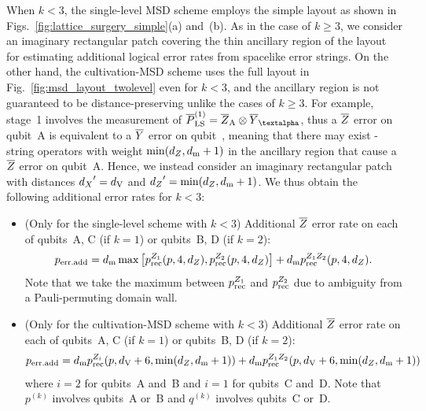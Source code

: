 \documentclass[
 prx,
 reprint,
 superscriptaddress,
 longbibliography,
 dvipsnames
]{revtex4-2}
\begin{document}
\begin{widetext}
When $k < 3$, the single-level MSD scheme employs the simple layout as shown in Figs.~\ref{fig:lattice_surgery_simple}(a) and~(b).
As in the case of $k \geq 3$, we consider an imaginary rectangular patch covering the thin ancillary region of the layout for estimating additional logical error rates from spacelike error strings.
On the other hand, the cultivation-MSD scheme uses the full layout in Fig.~\ref{fig:msd_layout_twolevel} even for $k < 3$, and the ancillary region is not guaranteed to be distance-preserving unlike the cases of $k \geq 3$.
For example, stage~1 involves the measurement of $\PstageLS{1} = \lgz_\mr{A} \otimes \lgy_\mralpha$, thus a $\overline{Z}$ error on qubit~A is equivalent to a $\overline{Y}$ error on qubit~\talpha, meaning that there may exist \gx-string operators with weight $\min({d_Z}, d_{\mathrm{m}} + 1)$ in the ancillary region that cause a $\overline{Z}$ error on qubit~A.
Hence, we instead consider an imaginary rectangular patch with distances ${d_X}'=d_{\mathrm{V}}$ and ${d_Z}' = \min({d_Z}, d_{\mathrm{m}} + 1)$.
We thus obtain the following additional error rates for $k < 3$:
\begin{itemize}
    \item (Only for the single-level scheme with $k < 3$) Additional $\overline{Z}$ error rate on each of qubits~A, C (if $k=1$) or qubits~B, D (if $k=2$):
    \begin{align*}
        p_{\mathrm{err.add}} = d_{\mathrm{m}}\max\qty[p_{\mathrm{rec}}^{Z_1} (p, 4, {d_Z}), p_{\mathrm{rec}}^{Z_2} (p, 4, {d_Z})] + d_{\mathrm{m}}p_{\mathrm{rec}}^{Z_1 Z_2}(p, 4, {d_Z}).
    \end{align*}
    Note that we take the maximum between $p_{\mathrm{rec}}^{Z_1}$ and $p_{\mathrm{rec}}^{Z_2}$ due to ambiguity from a Pauli-permuting domain wall.
    \item (Only for the cultivation-MSD scheme with $k < 3$) Additional $\overline{Z}$ error rate on each of qubits~A, C (if $k=1$) or qubits~B, D (if $k=2$):
    \begin{align*}
        p_{\mathrm{err.add}} = d_{\mathrm{m}}p_{\mathrm{rec}}^{Z_i}(p, d_{\mathrm{V}} + 6, \min({d_Z}, d_{\mathrm{m}} + 1)) + d_{\mathrm{m}}p_{\mathrm{rec}}^{Z_1 Z_2}(p, d_{\mathrm{V}} + 6, \min({d_Z}, d_{\mathrm{m}} + 1))
    \end{align*}
    where $i=2$ for qubits~A and~B and $i=1$ for qubits~C and~D.
    Note that $p^{(k)}$ involves qubits~A or~B and $q^{(k)}$ involves qubits~C or~D.
\end{itemize}


\end{widetext}
\end{document}

